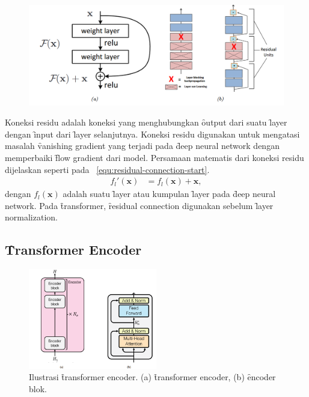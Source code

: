 	\begin{figure}[!ht]
		\centering
		\includegraphics[width=1\textwidth]{assets/pics/residual-connection.png}
		\label{fig:residual-connection}
	\end{figure}
	Koneksi residu adalah koneksi yang menghubungkan \f{output} dari suatu \f{layer} dengan \f{input} dari \f{layer} selanjutnya. Koneksi residu digunakan untuk mengatasi masalah \f{vanishing gradient} yang terjadi pada \f{deep neural network} dengan memperbaiki \f{flow gradient} dari model. Persamaan matematis dari koneksi residu dijelaskan seperti pada \equ~\ref{equ:residual-connection-start}.
	\begin{align}
		\label{equ:residual-connection-start}
		f_l'(\mathbf{x}) &= f_l(\mathbf{x}) + \mathbf{x},
	\end{align}
dengan $f_l(\mathbf{x})$ adalah suatu \f{layer} atau kumpulan \f{layer} pada \f{deep neural network}.
Pada \f{transformer}, \f{residual connection} digunakan sebelum \f{layer normalization}.

	\subsection{\f{Transformer Encoder}}
	\label{sec:encoder}

	\begin{figure}[!ht]
		\centering
		\includegraphics[width=0.5\textwidth]{assets/pics/final-transformers-encoder.png}
		\caption{Ilustrasi \f{transformer encoder}. (a) \f{transformer encoder}, (b) \f{encoder} blok.}
		\label{fig:transformer-encoder}
	\end{figure}

